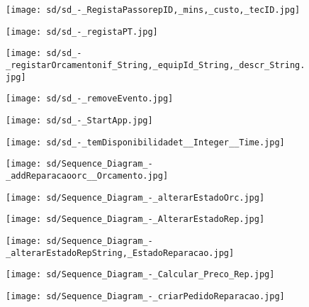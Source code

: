 \documentclass[relatorio.tex]{subfiles}
\begin{document}
\begin{landscape}
\begin{figure} \centering \texttt{[image: sd/sd\_-\_RegistaPassorepID,\_mins,\_custo,\_tecID.jpg]} \end{figure}
\begin{figure} \centering \texttt{[image: sd/sd\_-\_registaPT.jpg]} \end{figure}
\begin{figure} \centering \texttt{[image: sd/sd\_-\_registarOrcamentonif\_String,\_equipId\_String,\_descr\_String.jpg]} \end{figure}
\begin{figure} \centering \texttt{[image: sd/sd\_-\_removeEvento.jpg]} \end{figure}
\begin{figure} \centering \texttt{[image: sd/sd\_-\_StartApp.jpg]} \end{figure}
\begin{figure} \centering \texttt{[image: sd/sd\_-\_temDisponibilidadet\_\_Integer\_\_Time.jpg]} \end{figure}
\begin{figure} \centering \texttt{[image: sd/Sequence\_Diagram\_-\_addReparacaoorc\_\_Orcamento.jpg]} \end{figure}
\begin{figure} \centering \texttt{[image: sd/Sequence\_Diagram\_-\_alterarEstadoOrc.jpg]} \end{figure}
\begin{figure} \centering \texttt{[image: sd/Sequence\_Diagram\_-\_AlterarEstadoRep.jpg]} \end{figure}
\begin{figure} \centering \texttt{[image: sd/Sequence\_Diagram\_-\_alterarEstadoRepString,\_EstadoReparacao.jpg]} \end{figure}
\begin{figure} \centering \texttt{[image: sd/Sequence\_Diagram\_-\_Calcular\_Preco\_Rep.jpg]} \end{figure}
\begin{figure} \centering \texttt{[image: sd/Sequence\_Diagram\_-\_criarPedidoReparacao.jpg]} \end{figure}
\end{landscape}
\end{document}

